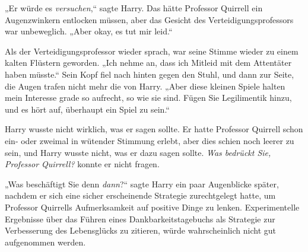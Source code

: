 „Er würde es \emph{versuchen},“ sagte Harry. Das hätte Professor Quirrell ein Augenzwinkern entlocken müssen, aber das Gesicht des Verteidigungsprofessors war unbeweglich. „Aber okay, es tut mir leid.“

Als der Verteidigungsprofessor wieder sprach, war seine Stimme wieder zu einem kalten Flüstern geworden. „Ich nehme an, dass ich Mitleid mit dem Attentäter haben müsste.“ Sein Kopf fiel nach hinten gegen den Stuhl, und dann zur Seite, die Augen trafen nicht mehr die von Harry. „Aber diese kleinen Spiele halten mein Interesse grade so aufrecht, so wie sie sind. Fügen Sie Legilimentik hinzu, und es hört auf, überhaupt ein Spiel zu sein.“

Harry wusste nicht wirklich, was er sagen sollte. Er hatte Professor Quirrell schon ein- oder zweimal in wütender Stimmung erlebt, aber dies schien noch leerer zu sein, und Harry wusste nicht, was er dazu sagen sollte. \emph{Was bedrückt Sie, Professor Quirrell?} konnte er nicht fragen.

„Was beschäftigt Sie denn \emph{dann}?“ sagte Harry ein paar Augenblicke später, nachdem er sich eine sicher erscheinende Strategie zurechtgelegt hatte, um Professor Quirrells Aufmerksamkeit auf positive Dinge zu lenken. Experimentelle Ergebnisse über das Führen eines Dankbarkeitstagebuchs als Strategie zur Verbesserung des Lebensglücks zu zitieren, würde wahrscheinlich nicht gut aufgenommen werden.

